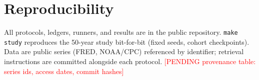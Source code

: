 \documentclass[11pt]{article}
\newcommand{\todoA}[1]{\textcolor{red}{[PENDING #1]}}
\begin{document}
\section{Reproducibility}\label{sec:repro}
All protocols, ledgers, runners, and results are in the public
repository. \texttt{make study} reproduces the 50-year study bit-for-bit
(fixed seeds, cohort checkpoints). Data are public series (FRED,
NOAA/CPC) referenced by identifier; retrieval instructions are committed
alongside each protocol. \todoA{provenance table: series ids, access
dates, commit hashes}



\end{document}
